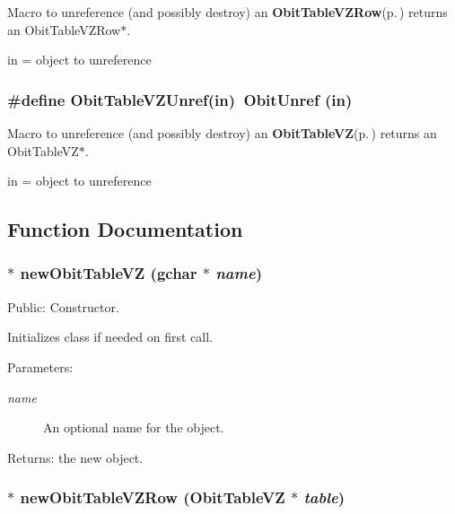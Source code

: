 Macro to unreference (and possibly destroy) an {\bf Obit\-Table\-VZRow}{\rm (p.\,\pageref{structObitTableVZRow})} returns an Obit\-Table\-VZRow$\ast$. 

in = object to unreference 
\subsubsection{\setlength{\rightskip}{0pt plus 5cm}\#define Obit\-Table\-VZUnref(in)\ Obit\-Unref (in)}\label{ObitTableVZ_8h_a1}


Macro to unreference (and possibly destroy) an {\bf Obit\-Table\-VZ}{\rm (p.\,\pageref{structObitTableVZ})} returns an Obit\-Table\-VZ$\ast$. 

in = object to unreference 

\subsection{Function Documentation}
\subsubsection{$\ast$ new\-Obit\-Table\-VZ (gchar $\ast$ {\em name})}\label{ObitTableVZ_8h_a11}


Public: Constructor. 

Initializes class if needed on first call. \begin{Desc}
\item[Parameters:]
\begin{description}
\item[{\em name}]An optional name for the object. \end{description}
\end{Desc}
\begin{Desc}
\item[Returns:]the new object. \end{Desc}
\subsubsection{$\ast$ new\-Obit\-Table\-VZRow ({\bf Obit\-Table\-VZ} $\ast$ {\em table})}\label{ObitTableVZ_8h_a8}


